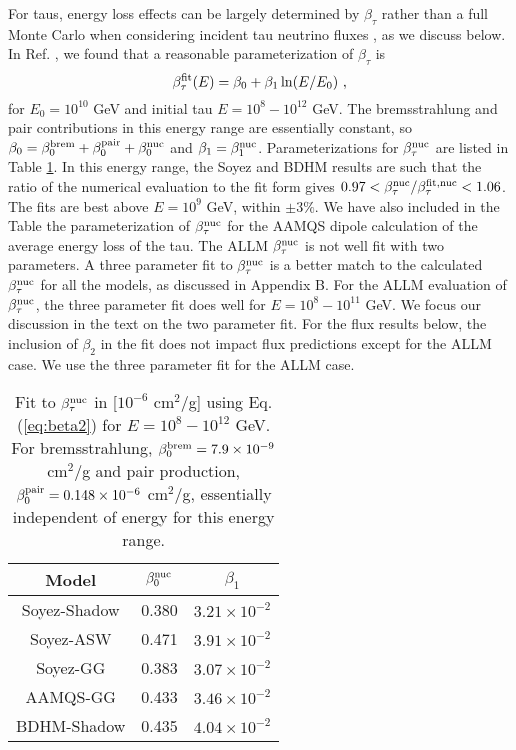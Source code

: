 \documentclass[aps,10pt,twocolumn,tightenlines]{revtex4-1}
\begin{document}
For taus, energy loss effects can be largely determined by $\beta_\tau$ rather than a full Monte Carlo when considering incident tau neutrino fluxes \cite{Chirkin:2004hz,Dutta:2005yt,Koehne:2013gpa}, as we discuss below. 
In Ref. \cite{Dutta:2005yt}, we found that a reasonable parameterization of $\beta_\tau$ is
\begin{equation}
\label{eq:beta2}
\beta_\tau^{\rm fit}(E) = \beta_0+\beta_1 \ln (E/E_0)\ ,
\end{equation}
for $E_0=10^{10}$ GeV and initial tau $E=10^8-10^{12}$ GeV. 
The bremsstrahlung and pair contributions in this energy range are essentially constant,
so $\beta_0 = \beta_0^{\rm brem}+\beta_0^{\rm pair}+\beta_0^{\rm nuc}$ and
$\beta_1 = \beta_1^{\rm nuc}$. Parameterizations for $\beta_\tau^{\rm nuc}$ are listed in Table \ref{table:betatau}.
In this energy range, the Soyez  and BDHM results are such that the ratio
of the numerical evaluation to the fit form gives $0.97<\beta_\tau^{\rm nuc}/\beta_\tau^{\rm fit,nuc}<1.06$. The fits are best above $E=10^9$ GeV, within $\pm 3\%$. We have also included in the Table the parameterization of $\beta_\tau^{\rm nuc}$ for the AAMQS dipole calculation of the average energy loss of the tau. The ALLM $\beta_\tau^{\rm nuc}$ is not well fit with two parameters. 
A three parameter fit to $\beta_\tau^{\rm nuc}$ is a better match to the calculated $\beta_\tau^{\rm nuc}$ for all the models, as discussed in Appendix B. For the ALLM evaluation of $\beta_\tau^{\rm nuc}$, the three parameter fit does well for $E=10^8-10^{11}$ GeV.
We focus our discussion in the text on the two parameter fit. For the flux results below, the inclusion of $\beta_2$ in the fit does not impact flux predictions except for the ALLM case. We use the three parameter fit for the ALLM case.

\begin{table}[htp]
\caption{ Fit to $\beta_\tau^{\rm nuc}$ in [$10^{-6}$ cm$^2$/g] using Eq. (\ref{eq:beta2}) for $E=10^8-10^{12}$ GeV. For
bremsstrahlung, $\beta_0^{\rm brem} =7.9\times 10^{-9}$ cm$^2$/g and pair production,
$\beta_0^{\rm pair}=0.148\times 10^{-6}$  cm$^2$/g, essentially independent of energy for this energy range.  }
\begin{center}
\begin{tabular}{|c|c|c|}
\hline
Model &$\beta_0^{\rm nuc}$ & $\beta_1$ \\
\hline 
\hline 
Soyez-Shadow & 0.380& $3.21\times 10^{-2}$ \\
\hline 
Soyez-ASW & 0.471 & $3.91\times 10^{-2}$  \\
\hline 
Soyez-GG & 0.383 & $3.07\times 10^{-2}$ \\
\hline 
AAMQS-GG& 0.433 &$3.46\times 10^{-2}$  \\
\hline 
BDHM-Shadow & 0.435 &$4.04\times 10^{-2}$  \\
\hline
\end{tabular}
\end{center}
\label{table:betatau}
\end{table}%
\end{document}
